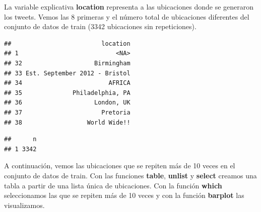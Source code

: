 \documentclass[]{article}
\newenvironment{Shaded}{\begin{snugshade}}{\end{snugshade}}
\newcommand{\DecValTok}[1]{\textcolor[rgb]{0.00,0.00,0.81}{#1}}
\newcommand{\KeywordTok}[1]{\textcolor[rgb]{0.13,0.29,0.53}{\textbf{#1}}}
\newcommand{\NormalTok}[1]{#1}
\newcommand{\OperatorTok}[1]{\textcolor[rgb]{0.81,0.36,0.00}{\textbf{#1}}}
\newcommand{\StringTok}[1]{\textcolor[rgb]{0.31,0.60,0.02}{#1}}
\begin{document}
La variable explicativa \textbf{location} representa a las ubicaciones donde se generaron los tweets. Vemos las 8 primeras y el número total de ubicaciones diferentes del conjunto de datos de train (3342
ubicaciones sin repeticiones).

\vspace{2mm}

\begin{Shaded}
\end{Shaded}

\begin{verbatim}
##                         location
## 1                           <NA>
## 32                    Birmingham
## 33 Est. September 2012 - Bristol
## 34                        AFRICA
## 35              Philadelphia, PA
## 36                    London, UK
## 37                      Pretoria
## 38                  World Wide!!
\end{verbatim}

\begin{Shaded}
\end{Shaded}

\begin{verbatim}
##      n
## 1 3342
\end{verbatim}

A continuación, vemos las ubicaciones que se repiten más de 10 veces en el conjunto de datos de train. Con las funciones \textbf{table}, \textbf{unlist} y \textbf{select} creamos una tabla a partir de una lista única de ubicaciones. Con la función \textbf{which} seleccionamos las que se repiten más de 10 veces y con la función \textbf{barplot} las visualizamos.

\vspace{2mm}

\begin{Shaded}
\end{Shaded}
\end{document}
